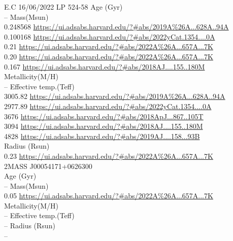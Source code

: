 E.C 16/06/2022
LP 524-58
Age (Gyr)\\
--
Mass(Msun)\\
0.248568 \url{https://ui.adsabs.harvard.edu/?#abs/2019A%26A...628A..94A}\\
0.100168 \url{https://ui.adsabs.harvard.edu/?#abs/2022yCat.1354....0A}\\
0.21 \url{https://ui.adsabs.harvard.edu/?#abs/2022A%26A...657A...7K}\\
0.20 \url{https://ui.adsabs.harvard.edu/?#abs/2022A%26A...657A...7K}\\
0.167 \url{https://ui.adsabs.harvard.edu/?#abs/2018AJ....155..180M}\\
Metallicity(M/H)\\
--
Effective temp.(Teff)\\
3005.82 \url{https://ui.adsabs.harvard.edu/?#abs/2019A%26A...628A..94A}\\
2977.89 \url{https://ui.adsabs.harvard.edu/?#abs/2022yCat.1354....0A}\\
3676 \url{https://ui.adsabs.harvard.edu/?#abs/2018ApJ...867..105T}\\
3094 \url{https://ui.adsabs.harvard.edu/?#abs/2018AJ....155..180M}\\
4828 \url{https://ui.adsabs.harvard.edu/?#abs/2019AJ....158...93B}\\
Radius (Rsun)\\
0.23 \url{https://ui.adsabs.harvard.edu/?#abs/2022A%26A...657A...7K}\\

2MASS J00054171+0626300\\
Age (Gyr)\\
--
Mass(Msun)\\
0.05 \url{https://ui.adsabs.harvard.edu/?#abs/2022A%26A...657A...7K}\\
Metallicity(M/H)\\
--
Effective temp.(Teff)\\
--
Radius (Rsun)\\
--